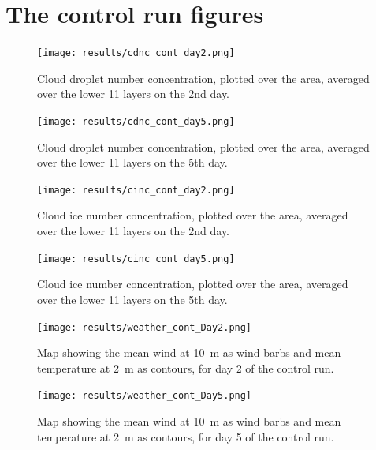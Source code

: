 


\newpage
\section{The control run figures}
\begin{figure}[h]
\centering
\texttt{[image: results/cdnc\_cont\_day2.png]}
\caption{Cloud droplet number concentration, plotted over the area, averaged over the lower 11 layers on the 2nd day.}
\label{fig:cdnc_cont_Day2}
\end{figure}

\begin{figure}[h]
\centering
\texttt{[image: results/cdnc\_cont\_day5.png]}
\caption{Cloud droplet number concentration, plotted over the area, averaged over the lower 11 layers on the 5th day.}
\label{fig:cdnc_cont_Day5}
\end{figure}

\begin{figure}[h]
\centering
\texttt{[image: results/cinc\_cont\_day2.png]}
\caption{Cloud ice number concentration, plotted over the area, averaged over the lower 11 layers on the 2nd day.}
\label{fig:cinc_cont_Day2}
\end{figure}

\begin{figure}[h]
\centering
\texttt{[image: results/cinc\_cont\_day5.png]}
\caption{Cloud ice number concentration, plotted over the area, averaged over the lower 11 layers on the 5th day.}
\label{fig:cinc_cont_Day5}
\end{figure}

\begin{figure}[h]
\centering
\texttt{[image: results/weather\_cont\_Day2.png]}
\caption{Map showing the mean wind at 10~m as wind barbs and mean temperature at 2~m as contours, for day 2 of the control run.}
\label{fig:weather_cont_Day2}
\end{figure}

\begin{figure}[h]
\centering
\texttt{[image: results/weather\_cont\_Day5.png]}
\caption{Map showing the mean wind at 10~m as wind barbs and mean temperature at 2~m as contours, for day 5 of the control run.}
\label{fig:weather_cont_Day5}
\end{figure}

